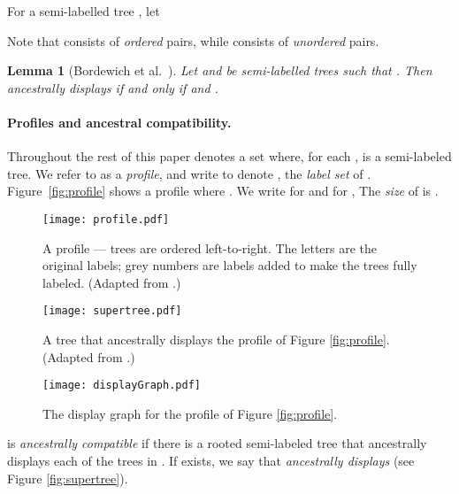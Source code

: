 \documentclass[11pt]{article}
\newtheorem{lemma}{Lemma}
\theoremstyle{definition}
\begin{document}
For a semi-labelled tree , let

Note that  consists of \emph{ordered} pairs, while  consists of \emph{unordered} pairs.

\begin{lemma}[Bordewich et al.\  \cite{BordewichEvansSemple2006}]\label{lm:DN}
Let  and  be semi-labelled trees such that . Then  ancestrally displays  if and only if  and .
\end{lemma}

\vspace{-1.5\parsep}

\paragraph{Profiles and ancestral compatibility.}
Throughout the rest of this paper  denotes a set where, for each ,  is a semi-labeled tree. We refer to  as a \emph{profile}, and write  to denote , the \emph{label set} of .   Figure~\ref{fig:profile} shows a profile where .
We write  for  and  for , The \emph{size} of  is .  



\begin{figure}\centering
\begin{minipage}[b]{0.46\linewidth}
  \texttt{[image: profile.pdf]}
  \caption{A profile  --- trees are ordered left-to-right. 
The letters are the original labels; grey numbers are labels added to make the trees fully labeled. (Adapted from  \cite{BerrySemple2006}.)}
  \label{fig:profile}
\end{minipage}
\quad
\begin{minipage}[b]{0.24\linewidth}
  \texttt{[image: supertree.pdf]}
  \caption{A tree  that ancestrally displays the profile of Figure \ref{fig:profile}. (Adapted from  \cite{BerrySemple2006}.)}
  \label{fig:supertree}
\end{minipage}
\quad
\begin{minipage}[b]{0.23\linewidth}
  \texttt{[image: displayGraph.pdf]}
  \caption{The display graph  for the profile of Figure \ref{fig:profile}.} \label{fig:displayGraph}
\end{minipage}
\end{figure}

 is \emph{ancestrally compatible} if there is a rooted semi-labeled  tree  that ancestrally displays each of the trees in .  If  exists, we say that  \emph{ancestrally displays}  (see Figure \ref{fig:supertree}). 
\end{document}
